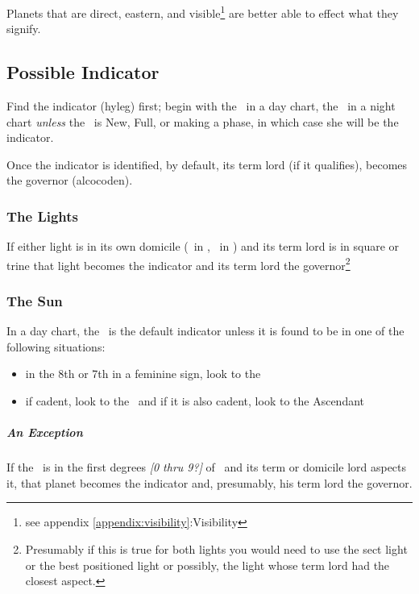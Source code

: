 Planets that are direct, eastern, and visible\footnote{see appendix \ref{appendix:visibility}:Visibility} are better able to effect what they signify.

\subsection{Possible Indicator}
Find the indicator (hyleg) first; begin with the \Sun\, in a day chart, the \Moon\, in a night chart \textsl{unless} the \Moon\,  is New, Full, or making a phase, in which case she will be the indicator.

Once the indicator is identified, by default, its term lord (if it qualifies), becomes the governor (alcocoden).

\subsubsection{The Lights}
If either light is in its own domicile (\Sun\, in \Leo, \Moon\, in \Cancer) and its term lord is in square or trine that light becomes the indicator and its term lord the governor\footnote{Presumably if this is true for both lights you would need to use the sect light or the best positioned light or possibly, the light whose term lord had the closest aspect.}

\subsubsection{The Sun}
In a day chart, the \Sun\, is the default indicator unless it is found to be in one of the following situations:
\vspace{-0.5em}
\begin{itemize}[topsep=0em,itemsep=0em]
\item {}in the 8th or 7th in a feminine sign, look to the \Moon
\item {}if cadent, look to the \Moon\, and if it is also cadent, look to the Ascendant
\end{itemize}

\subparagraph{An Exception}
If  the \Sun\, is in the first degrees \textsl{[0 thru 9?]} of \Aries\, and its term or domicile lord aspects it, that planet becomes the indicator and, presumably, his term lord the governor.

